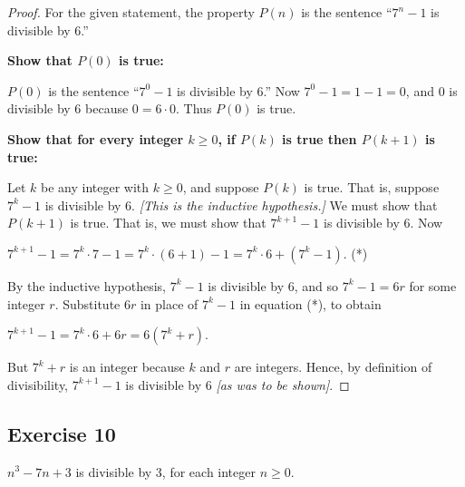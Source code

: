 \documentclass[14pt]{extarticle}
\begin{document}
\begin{proof}
For the given statement, the property $P(n)$ is the sentence “$7^n - 1$ is divisible by 6.” 

{\bf Show that $P(0)$ is true:} 

$P(0)$ is the sentence “$7^0 - 1$ is divisible by 6.” Now $7^0 - 1 = 1 - 1 = 0$, and 0 is divisible by 6 because $0 = 6 \cdot 0$. Thus $P(0)$ is true. 

{\bf Show that for every integer $k \geq 0$, if $P(k)$ is true then $P(k + 1)$ is true:} 

Let $k$ be any integer with $k \geq 0$, and suppose $P(k)$ is true. That is, suppose $7^k - 1$ is divisible by 6. {\it [This is the inductive hypothesis.]} We must show that $P(k + 1)$ is true. That is, we must show that $7^{k + 1} - 1$ is divisible by 6. Now 

$7^{k + 1} - 1 = 7^k \cdot 7 - 1 = 7^k \cdot (6 + 1) - 1 = 7^k \cdot 6 + (7^k - 1)$. (*) 

By the inductive hypothesis, $7^k - 1$ is divisible by 6, and so $7^k - 1 = 6r$ for some integer $r$. Substitute $6r$ in place of $7^k - 1$ in equation (*), to obtain 

$7^{k + 1} - 1 = 7^k \cdot 6 + 6r = 6(7^k + r)$. 

But $7^k + r$ is an integer because $k$ and $r$ are integers. Hence, by definition of divisibility, $7^{k + 1} - 1$ is divisible by 6 {\it [as was to be shown]}.
\end{proof}

\subsection{Exercise 10}
$n^3 - 7n + 3$ is divisible by 3, for each integer $n \geq 0$.
\end{document}
